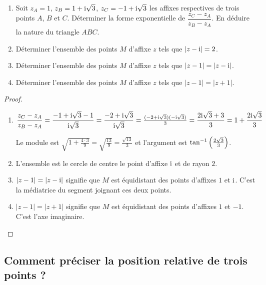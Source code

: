 \begin{example}
\begin{enumerate}
\item Soit $z_A = 1$, $z_B = 1 + \text{i}\sqrt{3}$, $z_C = -1 + \text{i}\sqrt{3}$ les affixes respectives de trois points $A$, $B$ et $C$. Déterminer la forme exponentielle de $\dfrac{z_C - z_A}{z_B - z_A}$. En déduire la nature du triangle $ABC$.

\item Déterminer l'ensemble des points $M$ d'affixe $z$ tels que $|z - \text{i}| = 2$.

\item Déterminer l'ensemble des points $M$ d'affixe $z$ tels que $|z - 1| = |z - \text{i}|$.

\item Déterminer l'ensemble des points $M$ d'affixe $z$ tels que $|z - 1| = |z + 1|$.
\end{enumerate}

\begin{proof}
\begin{enumerate}
\item $\dfrac{z_C - z_A}{z_B - z_A} = \dfrac{-1 + \text{i}\sqrt{3} - 1}{\text{i}\sqrt{3}} = \dfrac{-2 + \text{i}\sqrt{3}}{\text{i}\sqrt{3}} = \frac{(-2 + \text{i}\sqrt{3})(-\text{i}\sqrt{3})}{3} = \dfrac{2\text{i}\sqrt{3} + 3}{3} = 1 + \dfrac{2\text{i}\sqrt{3}}{3}$

Le module est $\sqrt{1 + \frac{4 \cdot 3}{9}} = \sqrt{\frac{13}{9}} = \frac{\sqrt{13}}{3}$ et l'argument est $\tan^{-1}\left(\frac{2\sqrt{3}}{3}\right)$.

\item L'ensemble est le cercle de centre le point d'affixe $\text{i}$ et de rayon $2$.

\item $|z - 1| = |z - \text{i}|$ signifie que $M$ est équidistant des points d'affixes $1$ et $\text{i}$. C'est la médiatrice du segment joignant ces deux points.

\item $|z - 1| = |z + 1|$ signifie que $M$ est équidistant des points d'affixes $1$ et $-1$. C'est l'axe imaginaire.
\end{enumerate}
\end{proof}
\end{example}

\subsection{Comment préciser la position relative de trois points ?}

